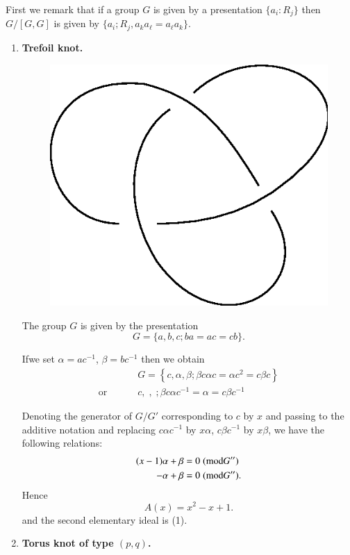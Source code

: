 First we remark that if a group $G$ is given by a presentation $\{a_i
: R_j \}$ then $G/ [G,G]$ is given by $\{a_i ; R_j, a_k a_\ell =
a_\ell a_k \}$. 
\begin{enumerate}[1)]
\item \textbf{Trefoil knot.}

\begin{figure}[H]
\centering
\includegraphics{vol44-fig/fig44-11.eps}
\end{figure}

The group $G$ is given by the presentation 
$$
G= \{ a, b, c; ba= ac = cb \}. 
$$

If\pageoriginale we set $\alpha = ac^{-1 }$, $\beta = bc^{-1}$ then we
obtain  
\begin{align*}
& G = \left\{ c, \alpha, \beta; \beta c  \alpha c = \alpha c^2 = c
  \beta c \right\} \\
\text{or  } \qquad & c, \; , \; ; \beta c \alpha c^{-1} = \alpha = c
\beta c^{-1}
\end{align*}

Denoting the generator of $G/ G'$ corresponding to $c$ by $x$ and
passing to the additive notation and replacing $c \alpha c^{-1}$ by $x
\alpha$, $c \beta c^{-1}$ by $x \beta$, we have the following
relations: 
\begin{align*}
 (x-1) \alpha + \beta & = 0 \; ({\rm mod} G'') \\
 -\alpha + \beta & = 0 \; ({\rm mod} G'').
\end{align*} 
Hence 
$$
A(x) = x^2 - x + 1. 
$$
and the second elementary ideal is (1).


\item \textbf{Torus knot of type {\boldmath$(p, q)$}.}
\end{enumerate} 

